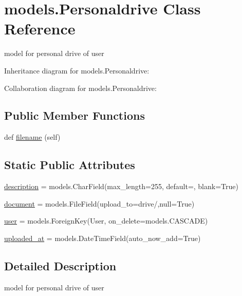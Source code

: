 \hypertarget{classmodels_1_1_personaldrive}{}\section{models.\+Personaldrive Class Reference}
\label{classmodels_1_1_personaldrive}


model for personal drive of user  




Inheritance diagram for models.\+Personaldrive\+:


Collaboration diagram for models.\+Personaldrive\+:
\subsection*{Public Member Functions}
\begin{DoxyCompactItemize}
\item 
def \hyperlink{classmodels_1_1_personaldrive_ab01d89944d80fb6903f0f83b06cd65d6}{filename} (self)
\end{DoxyCompactItemize}
\subsection*{Static Public Attributes}
\begin{DoxyCompactItemize}
\item 
\hyperlink{classmodels_1_1_personaldrive_ad10d098b82ca7ad8b7ff987aff01e950}{description} = models.\+Char\+Field(max\+\_\+length=255, default=\textquotesingle{}\textquotesingle{}, blank=True)
\item 
\hyperlink{classmodels_1_1_personaldrive_a0407238be29da4de913f3154dd149ebe}{document} = models.\+File\+Field(upload\+\_\+to=\textquotesingle{}drive/\textquotesingle{},null=True)
\item 
\hyperlink{classmodels_1_1_personaldrive_ad12833f4899ed324257c155ea3804bd3}{user} = models.\+Foreign\+Key(User, on\+\_\+delete=models.\+C\+A\+S\+C\+A\+DE)
\item 
\hyperlink{classmodels_1_1_personaldrive_a9178b14fa1898652abfb740f2ae8573e}{uploaded\+\_\+at} = models.\+Date\+Time\+Field(auto\+\_\+now\+\_\+add=True)
\end{DoxyCompactItemize}


\subsection{Detailed Description}
model for personal drive of user 


